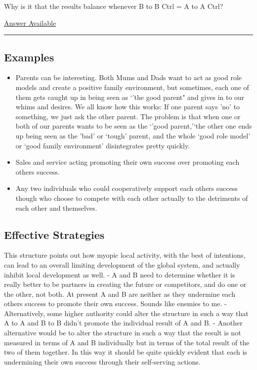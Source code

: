 \documentclass[]{memoir}
\begin{document}

Why is it that the results balance whenever B to B Ctrl = A to A Ctrl?

\hyperref[Ans-5-6]{Answer Available}

\begin{center}\rule{3in}{0.4pt}\end{center}

\subsection{Examples}

\begin{itemize}
\itemsep1pt\parskip0pt
\item
  Parents can be interesting. Both Mums and Dads want to act as good
  role models and create a positive family environment, but sometimes,
  each one of them gets caught up in being seen as `'the good parent"
  and gives in to our whims and desires. We all know how this works: If
  one parent says 'no' to something, we just ask the other parent. The
  problem is that when one or both of our parents wants to be seen as
  the `'good parent,'`the other one ends up being seen as the 'bad' or
  `tough' parent, and the whole `good role model' or `good family
  environment' disintegrates pretty quickly.
\item
  Sales and service acting promoting their own success over promoting
  each others success.
\item
  Any two individuals who could cooperatively support each others
  success though who choose to compete with each other actually to the
  detriments of each other and themselves.
\end{itemize}

\subsection{Effective Strategies}

This structure points out how myopic local activity, with the best of
intentions, can lead to an overall limiting development of the global
system, and actually inhibit local development as well. - A and B need
to determine whether it is really better to be partners in creating the
future or competitors, and do one or the other, not both. At present A
and B are neither as they undermine each others success to promote their
own success. Sounds like enemies to me. - Alternatively, some higher
authority could alter the structure in such a way that A to A and B to B
didn't promote the individual result of A and B. - Another alternative
would be to alter the structure in such a way that the result is not
measured in terms of A and B individually but in terms of the total
result of the two of them together. In this way it should be quite
quickly evident that each is undermining their own success through their
self-serving actions.
\end{document}
